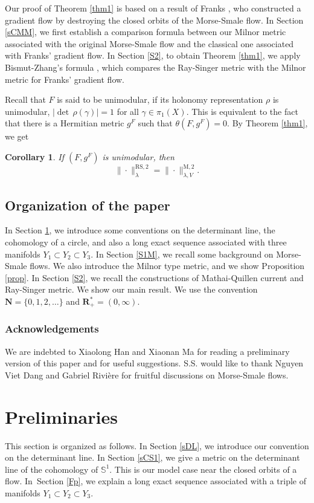 \documentclass[JEP,XML,SOM,Unicode]{cedram}
\newcommand{\rM}{\mathrm{M}}
\newcommand{\RS}{\mathrm{RS}}
\theoremstyle{plain}
\newtheorem{cor}[lem]{Corollary}
\theoremstyle{definition}
\theoremstyle{remark}
\newcommand{\bN}{\mathbf{N}}
\newcommand{\bR}{\mathbf{R}}
\newcommand{\bbS}{\mathbb{S}}
\begin{document}
Our proof of Theorem \ref{thm1} is based on a result of Franks
\cite[Prop.\,5.1]{Franks1979}, who
constructed a gradient flow by destroying the
closed orbits of the Morse-Smale flow.
In Section \ref{sCMM}, we first
establish a comparison formula between our Milnor metric associated with the original Morse-Smale flow
and the classical one associated with Franks'
gradient flow. In Section \ref{S2}, to obtain Theorem \ref{thm1}, we apply Bismut-Zhang's formula \cite[Th.\,0.2]{BZ92}, which compares the Ray-Singer metric with the
Milnor metric for Franks' gradient flow.

Recall that $F$ is said to be unimodular, if its holonomy representation
$\rho$ is unimodular, \ie $|{\det\,} \rho(\gamma)|= 1$ for all
$\gamma\in \pi_{1}(X)$. This is
equivalent to the fact that there is a Hermitian metric $g^{F}$
such that $\theta(F,g^{F})=0.$
By Theorem \ref{thm1}, we get
\begin{cor}
If $(F,g^{F})$ is unimodular, then
\begin{equation*}
\|{\cdot}\|^{\RS,2}_{\lambda}=\|{\cdot}\|^{\rM,2}_{\lambda,V}.
\end{equation*}
\end{cor}

\subsection{Organization of the paper}
In Section \ref{Sp1}, we
introduce some conventions on the determinant line, the cohomology
of a circle, and also a long exact sequence associated with three manifolds $Y_{1}\subset Y_{2}\subset Y_{3}$. In Section \ref{S1M}, we recall some background on Morse-Smale
flows. We also introduce the Milnor type metric, and we show Proposition
\ref{prop}. In
Section \ref{S2}, we recall the constructions of Mathai-Quillen
current and Ray-Singer metric. We show our main result.
We use the convention $\bN=\{0,1,2,\ldots\}$ and $\bR_{+}^{*}=(0,\infty)$.

\subsubsection*{Acknowledgements}
We are indebted to Xiaolong Han and Xiaonan Ma for reading a preliminary version of this paper and for useful suggestions. S.S. would like to thank Nguyen Viet Dang and Gabriel Rivière for
fruitful discussions on Morse-Smale flows.

\section{Preliminaries} \label{Sp1}
This section is organized as follows. In Section \ref{sDL}, we
introduce our convention on the determinant line. In Section
\ref{sCS1}, we give a metric on the determinant line of the
cohomology of $\bbS^{1}$. This is our model case near the
closed orbits of a flow. In~Section \ref{Fp}, we explain a long exact
sequence associated with a triple of manifolds $Y_{1}\subset
Y_{2}\subset Y_{3}$.
\end{document}

